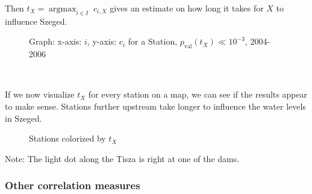 \documentclass{article}
\newcommand{\tmop}[1]{\ensuremath{\operatorname{#1}}}
\begin{document}
Then $t_X = \tmop{argmax}_{i \in I} \;c_{i, X}$ gives an estimate on how long it
takes for $X$ to influence Szeged.

\begin{figure}[h]
  \caption{Graph: x-axis: $i$, y-axis: $c_i$ for a Station, $p_{\tmop{val}}
  (t_X) \ll 10^{- 3}$, 2004-2006}
\end{figure}

\

If we now visualize $t_X$ for every station on a map, we can see if the
results appear to make sense. Stations further upstream take longer to
influence the water levels in Szeged.

\begin{figure}[h]
  \caption{Stations colorized by $t_X$}
\end{figure}

Note: The light dot along the Tisza is right at one of the dams.

\subsubsection{Other correlation measures}
\end{document}
